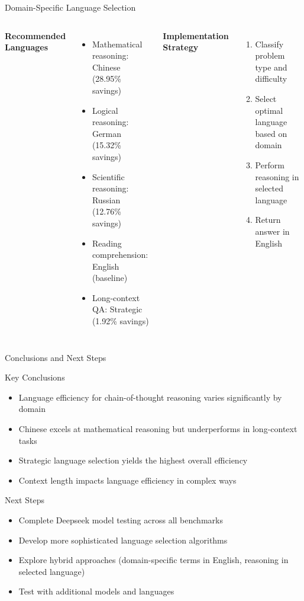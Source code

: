 \documentclass{beamer}
\begin{document}
\begin{frame}{Domain-Specific Language Selection}
    \begin{columns}
        \textbf{Recommended Languages}
        \begin{itemize}
            \item Mathematical reasoning: Chinese (28.95\% savings)
            \item Logical reasoning: German (15.32\% savings)
            \item Scientific reasoning: Russian (12.76\% savings)
            \item Reading comprehension: English (baseline)
            \item Long-context QA: Strategic (1.92\% savings)
        \end{itemize}
        
        \textbf{Implementation Strategy}
        \begin{enumerate}
            \item Classify problem type and difficulty
            \item Select optimal language based on domain
            \item Perform reasoning in selected language
            \item Return answer in English
        \end{enumerate}
    \end{columns}
\end{frame}

\begin{frame}{Conclusions and Next Steps}
    \begin{block}{Key Conclusions}
        \begin{itemize}
            \item Language efficiency for chain-of-thought reasoning varies significantly by domain
            \item Chinese excels at mathematical reasoning but underperforms in long-context tasks
            \item Strategic language selection yields the highest overall efficiency
            \item Context length impacts language efficiency in complex ways
        \end{itemize}
    \end{block}
    
    \begin{block}{Next Steps}
        \begin{itemize}
            \item Complete Deepseek model testing across all benchmarks
            \item Develop more sophisticated language selection algorithms
            \item Explore hybrid approaches (domain-specific terms in English, reasoning in selected language)
            \item Test with additional models and languages
        \end{itemize}
    \end{block}
\end{frame}
\end{document}
